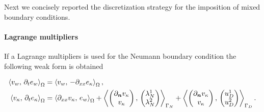 Next we concisely reported the discretization strategy for the imposition of mixed boundary conditions.

\paragraph{Lagrange multipliers}
If a Lagrange multipliers is used for the Neumann boundary condition the following weak form is obtained

\begin{equation}
\begin{aligned}
\inner[\Omega]{v_w}{\partial_t e_w} &= \inner[\Omega]{v_w}{-\partial_{xx} e_\kappa} , \\
\inner[\Omega]{v_\kappa}{\partial_t e_\kappa} &= \inner[\Omega]{\partial_{xx} v_\kappa}{ e_w}  + \inner[\Gamma_N]{\begin{pmatrix}
	\partial_{\bm{n}} v_\kappa \\
	v_\kappa \\
	\end{pmatrix}}{\begin{pmatrix}
	\lambda_{N}^1 \\
	\lambda_{N}^2 \\
	\end{pmatrix}} + \inner[\Gamma_D]{\begin{pmatrix}
	\partial_{\bm{n}} v_\kappa \\
	v_\kappa \\
	\end{pmatrix}}{\begin{pmatrix}
	u_{D}^1 \\
	u_{D}^2 \\
	\end{pmatrix}}.
\end{aligned}
\end{equation}


